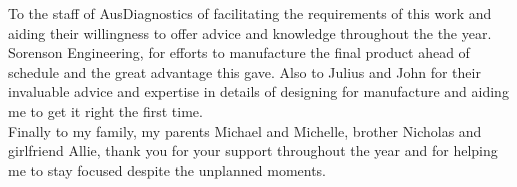 To the staff of AusDiagnostics of facilitating the requirements of this work and aiding their willingness to offer advice and knowledge throughout the the year.\\

Sorenson Engineering, for efforts to manufacture the final product ahead of schedule and the great advantage this gave. Also to Julius and John for their invaluable advice and expertise in details of designing for manufacture and aiding me to get it right the first time.\\

Finally to my family, my parents Michael and Michelle, brother Nicholas and girlfriend Allie, thank you for your support throughout the year and for helping me to stay focused despite the unplanned moments.

\tableofcontents 
\listoffigures
\clearpage

    

%
